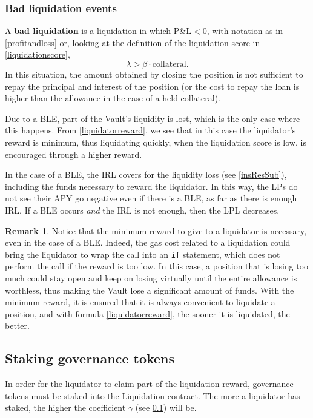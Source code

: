 \documentclass[a4paper,10 pt]{article}
\theoremstyle{definition}
\newtheorem{remark}{Remark}
\begin{document}
\subsubsection{Bad liquidation events}\label{bleSubSub}
A {\bf bad liquidation} is a liquidation in which  $\text{P\&L} < 0$, with notation as in \eqref{profitandloss} or, looking at the definition of the liquidation score in \eqref{liquidationscore}, 
$$\lambda > \beta \cdot \text{collateral}.$$ In this situation, the amount obtained by closing the position is not sufficient to repay the principal and interest of the position (or the cost to repay the loan is higher than the allowance in the case of a held collateral).

Due to a BLE, part of the Vault's liquidity is lost, which is the only case where this happens. From \eqref{liquidatorreward}, we see that in this case the liquidator's reward is minimum, thus liquidating quickly, when the liquidation score is low, is encouraged through a higher reward.

In the case of a BLE, the IRL covers for the liquidity loss (see \ref{insResSub}), including the funds necessary to reward the liquidator. In this way, the LPs do not see their APY go negative even if there is a BLE, as far as there is enough IRL. If a BLE occurs {\it and} the IRL is not enough, then the LPL decreases.

\begin{remark}\label{nopunishments}
Notice that the minimum reward to give to a liquidator is necessary, even in the case of a BLE. Indeed, the gas cost related to a liquidation could bring the liquidator to wrap the call into an \verb|if| statement, which does not perform the call if the reward is too low. In this case, a position that is losing too much could stay open and keep on losing virtually until the entire allowance is worthless, thus making the Vault lose a significant amount of funds. With the minimum reward, it is ensured that it is always convenient to liquidate a position, and with formula \eqref{liquidatorreward}, the sooner it is liquidated, the better.
\end{remark} 

\subsection{Staking governance tokens}\label{sgtSub}

In order for the liquidator to claim part of the liquidation reward, governance tokens must be staked into the Liquidation contract. The more a liquidator has staked, the higher the coefficient $\gamma$ (see \ref{sgtSub}) will be.
\end{document}
